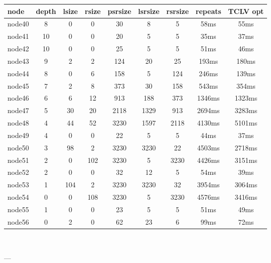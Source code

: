 \begin{tabular}{|l|c|c|c|c|c|c|c|c|}
\hline node & depth & lsize & rsize & psrsize & lsrsize & rsrsize   & repeats & TCLV opt\\
    \hline node40 & 8 & 0 & 0 & 30 & 8 & 5 & 58ms & 55ms\\
    \hline node41 & 10 & 0 & 0 & 20 & 5 & 5 & 35ms & 37ms\\
    \hline node42 & 10 & 0 & 0 & 25 & 5 & 5 & 51ms & 46ms\\
    \hline node43 & 9 & 2 & 2 & 124 & 20 & 25 & 193ms & 180ms\\
    \hline node44 & 8 & 0 & 6 & 158 & 5 & 124 & 246ms & 139ms\\
    \hline node45 & 7 & 2 & 8 & 373 & 30 & 158 & 543ms & 354ms\\
    \hline node46 & 6 & 6 & 12 & 913 & 188 & 373 & 1346ms & 1323ms\\
    \hline node47 & 5 & 30 & 20 & 2118 & 1329 & 913 & 2694ms & 3283ms\\
    \hline node48 & 4 & 44 & 52 & 3230 & 1597 & 2118 & 4130ms & 5101ms\\
    \hline node49 & 4 & 0 & 0 & 22 & 5 & 5 & 44ms & 37ms\\
    \hline node50 & 3 & 98 & 2 & 3230 & 3230 & 22 & 4503ms & 2718ms\\
    \hline node51 & 2 & 0 & 102 & 3230 & 5 & 3230 & 4426ms & 3151ms\\
    \hline node52 & 2 & 0 & 0 & 32 & 12 & 5 & 54ms & 39ms\\
    \hline node53 & 1 & 104 & 2 & 3230 & 3230 & 32 & 3954ms & 3064ms\\
    \hline node54 & 0 & 0 & 108 & 3230 & 5 & 3230 & 4576ms & 3416ms\\
    \hline node55 & 1 & 0 & 0 & 23 & 5 & 5 & 51ms & 49ms\\
    \hline node56 & 0 & 2 & 0 & 62 & 23 & 6 & 99ms & 72ms\\

\hline
\end{tabular} \

---

